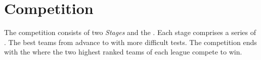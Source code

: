 \section{Competition}
The competition consists of two \emph{Stages} and the \FINAL{}. Each stage comprises a series of . The best teams from \SONE{} advance to \STWO{} with more difficult tests. The competition ends with the \FINAL{} where the two highest ranked teams of each league compete to win.